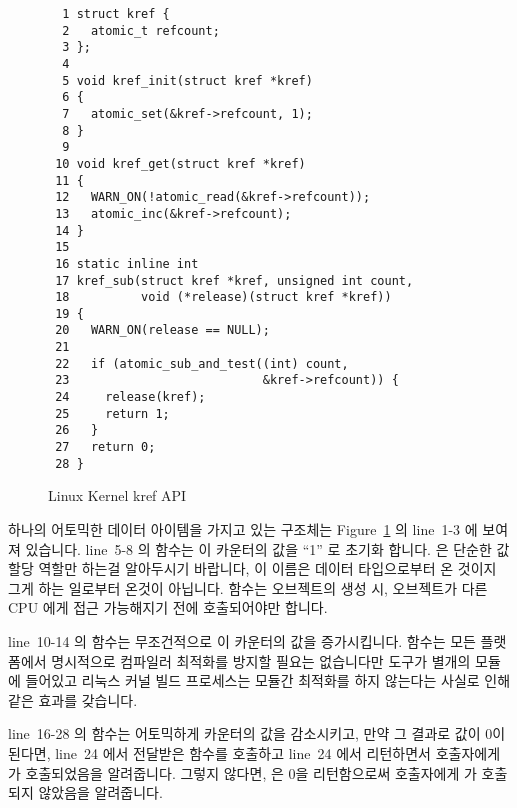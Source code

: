\begin{figure}[htbp]
{ \scriptsize
\begin{verbatim}
  1 struct kref {
  2   atomic_t refcount;
  3 };
  4 
  5 void kref_init(struct kref *kref)
  6 {
  7   atomic_set(&kref->refcount, 1);
  8 }
  9 
 10 void kref_get(struct kref *kref)
 11 {
 12   WARN_ON(!atomic_read(&kref->refcount));
 13   atomic_inc(&kref->refcount);
 14 }
 15 
 16 static inline int
 17 kref_sub(struct kref *kref, unsigned int count,
 18          void (*release)(struct kref *kref))
 19 {
 20   WARN_ON(release == NULL);
 21 
 22   if (atomic_sub_and_test((int) count,
 23                           &kref->refcount)) {
 24     release(kref);
 25     return 1;
 26   }
 27   return 0;
 28 }
\end{verbatim}
}
\caption{Linux Kernel kref API}
\label{fig:defer:Linux Kernel kref API}
\end{figure}

하나의 어토믹한 데이터 아이템을 가지고 있는  구조체는
Figure~\ref{fig:defer:Linux Kernel kref API} 의 line~1-3 에 보여져 있습니다.
line~5-8 의  함수는 이 카운터의 값을 ``1'' 로 초기화 합니다.
 은 단순한 값 할당 역할만 하는걸 알아두시기 바랍니다, 이
이름은  데이터 타입으로부터 온 것이지 그게 하는 일로부터 온것이
아닙니다.
 함수는 오브젝트의 생성 시, 오브젝트가 다른 CPU 에게 접근
가능해지기 전에 호출되어야만 합니다.
\iffalse

The \co{kref} structure itself, consisting of a single atomic
data item, is shown in lines~1-3 of
Figure~\ref{fig:defer:Linux Kernel kref API}.
The \co{kref_init()} function on lines~5-8 initializes the counter
to the value ``1''.
Note that the \co{atomic_set()} primitive is a simple
assignment, the name stems from the data type of \co{atomic_t}
rather than from the operation.
The \co{kref_init()} function must be invoked during object creation,
before the object has been made available to any other CPU.
\fi

line~10-14 의  함수는 무조건적으로 이 카운터의 값을 증가시킵니다.
 함수는 모든 플랫폼에서 명시적으로 컴파일러 최적화를 방지할
필요는 없습니다만  도구가 별개의 모듈에 들어있고 리눅스 커널 빌드
프로세스는 모듈간 최적화를 하지 않는다는 사실로 인해 같은 효과를 갖습니다.

line~16-28 의  함수는 어토믹하게 카운터의 값을 감소시키고, 만약
그 결과로 값이 0이 된다면, line~24 에서 전달받은  함수를 호출하고
line~24 에서 리턴하면서 호출자에게  가 호출되었음을 알려줍니다.
그렇지 않다면,  은 0을 리턴함으로써 호출자에게  가
호출되지 않았음을 알려줍니다.
\iffalse

